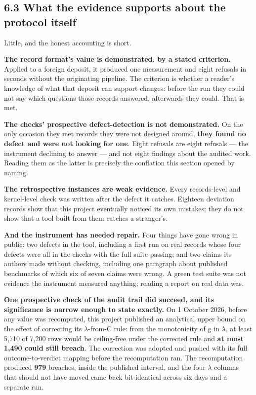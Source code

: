 \documentclass[
  10pt,
]{article}
\begin{document}
\subsection{6.3 What the evidence supports about the protocol
itself}\label{what-the-evidence-supports-about-the-protocol-itself}

Little, and the honest accounting is short.

\textbf{The record format's value is demonstrated, by a stated
criterion.} Applied to a foreign deposit, it produced one measurement
and eight refusals in seconds without the originating pipeline. The
criterion is whether a reader's knowledge of what that deposit can
support changes: before the run they could not say which questions those
records answered, afterwards they could. That is met.

\textbf{The checks' prospective defect-detection is not demonstrated.}
On the only occasion they met records they were not designed around,
\textbf{they found no defect and were not looking for one}. Eight
refusals are eight refusals --- the instrument declining to answer ---
and not eight findings about the audited work. Reading them as the
latter is precisely the conflation this section opened by naming.

\textbf{The retrospective instances are weak evidence.} Every
records-level and kernel-level check was written after the defect it
catches. Eighteen deviation records show that this project eventually
noticed its own mistakes; they do not show that a tool built from them
catches a stranger's.

\textbf{And the instrument has needed repair.} Four things have gone
wrong in public: two defects in the tool, including a first run on real
records whose four defects were all in the checks with the full suite
passing; and two claims its authors made without checking, including one
paragraph about published benchmarks of which six of seven claims were
wrong. A green test suite was not evidence the instrument measured
anything; reading a report on real data was.

\textbf{One prospective check of the audit trail did succeed, and its
significance is narrow enough to state exactly.} On 1 October 2026,
before any value was recomputed, this project published an analytical
upper bound on the effect of correcting its \(\lambda\)-from-C rule:
from the monotonicity of g in \(\lambda\), at least 5,710 of 7,200 rows
would be ceiling-free under the corrected rule and \textbf{at most 1,490
could still breach}. The correction was adopted and pushed with its full
outcome-to-verdict mapping before the recomputation ran. The
recomputation produced \textbf{979} breaches, inside the published
interval, and the four \(\lambda\) columns that should not have moved
came back bit-identical across six days and a separate run.
\end{document}
